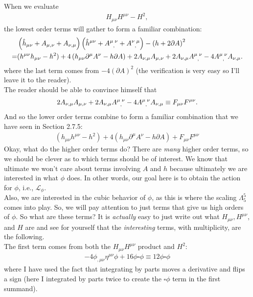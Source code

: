 \documentclass{book}
\theoremstyle{definition}
\newcommand{\p}{\partial}
\newcommand{\lag}{\mathcal{L}}
\newcommand{\nn}{\nonumber}
\newcommand{\lp}{\left(}
\newcommand{\rp}{\right)}
\begin{document}
\begin{framed}
	When we evaluate
	\begin{align}
	H_{\mu\nu}H^{\mu\nu} - H^2,
	\end{align}
	the lowest order terms will gather to form a familiar combination:
	\begin{align}
	&\lp \hat{h}_{\mu\nu} + A_{\mu,\nu} + A_{\nu,\mu} \rp \lp \hat{h}^{\mu\nu} + \tensor{A}{^\mu_,^\nu} + \tensor{A}{^\nu_,^\mu} \rp - \lp h + 2\p A \rp^2\nn\\
	=& (h^{\mu\nu}h_{\mu\nu} - h^2) + 4\lp h_{\mu\nu}\p^\mu A^\nu - h\p A \rp  + 2A_{\nu,\mu}A_{\mu,\nu} + 2A_{\nu,\mu}\tensor{A}{^\mu_,^\nu} - 4\tensor{A}{^\mu_,^\nu}A_{\nu,\mu}.
	\end{align}
	where the last term comes from $-4(\p A)^2$ (the verification is very easy so I'll leave it to the reader).\\
	
	The reader should be able to convince himself that
	\begin{align}
	2A_{\nu,\mu}A_{\mu,\nu} + 2A_{\nu,\mu}\tensor{A}{^\mu_,^\nu} - 4\tensor{A}{^\mu_,^\nu}A_{\nu,\mu} \equiv F_{\mu\nu}F^{\mu\nu}.
	\end{align}
	And so the lower order terms combine to form a familiar combination that we have seen in Section 2.7.5:
	\begin{align}
	(h_{\mu\nu}h^{\mu\nu} - h^2) + 4(h_{\mu\nu}\p^\mu A^\nu - h\p A) + F_{\mu\nu}F^{\mu\nu}
	\end{align}
	Okay, what do the higher order terms do? There are \textit{many} higher order terms, so we should be clever as to which terms should be of interest. We know that ultimate we won't care about terms involving $A$ and $h$ because ultimately we are interested in what $\phi$ does. In other words, our goal here is to obtain the action for $\phi$, i.e., $\lag_\phi$. \\
	
	Also, we are interested in the cubic behavior of $\phi$, as this is where the scaling $\Lambda_5^5$ comes into play. So, we will pay attention to just terms that give us high orders of $\phi$. So what are these terms? It is \textit{actually} easy to just write out what $H_{\mu\nu}, H^{\mu\nu}$, and $H$ are and see for yourself that the \textit{interesting} terms, with multiplicity, are the following.\\
	
	The first term comes from both the $H_{\mu\nu}H^{\mu\nu}$ product and $H^2$:
	\begin{align}
	-4 \phi_{,\mu\nu}\eta^{\mu\nu}\phi + 16 \phi \square \phi \equiv 12 \phi \square \phi
	\end{align}
	where I have used the fact that integrating by parts moves a derivative and flips a sign (here I integrated by parts twice to create the $\square \phi$ term in the first summand).\\
	

\end{framed}
\end{document}
